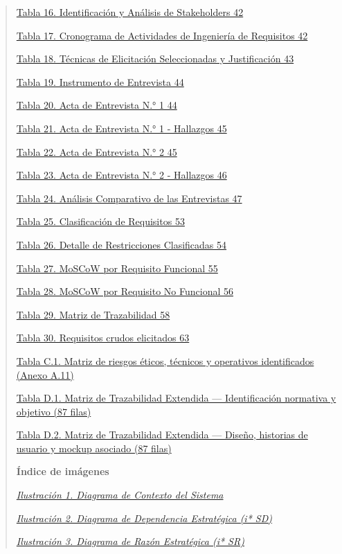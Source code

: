 \documentclass[
]{article}
\begin{document}
\begin{quote}
\hyperref[_bookmark70]{Tabla 16. Identificación y Análisis de Stakeholders 42}

\hyperref[_bookmark72]{Tabla 17. Cronograma de Actividades de Ingeniería de Requisitos 42}

\hyperref[_bookmark74]{Tabla 18. Técnicas de Elicitación Seleccionadas y Justificación 43}

\hyperref[_bookmark77]{Tabla 19. Instrumento de Entrevista 44}

\hyperref[_bookmark79]{Tabla 20. Acta de Entrevista N.° 1 44}

\hyperref[_bookmark80]{Tabla 21. Acta de Entrevista N.° 1 - Hallazgos 45}

\hyperref[_bookmark81]{Tabla 22. Acta de Entrevista N.° 2 45}

\hyperref[_bookmark82]{Tabla 23. Acta de Entrevista N.° 2 - Hallazgos 46}

\hyperref[_bookmark84]{Tabla 24. Análisis Comparativo de las Entrevistas 47}

\hyperref[_bookmark102]{Tabla 25. Clasificación de Requisitos 53}

\hyperref[_bookmark103]{Tabla 26. Detalle de Restricciones Clasificadas 54}

\hyperref[_bookmark104]{Tabla 27. MoSCoW por Requisito Funcional 55}

\hyperref[_bookmark106]{Tabla 28. MoSCoW por Requisito No Funcional 56}

\hyperref[_bookmark113]{Tabla 29. Matriz de Trazabilidad 58}

\hyperref[_bookmark117]{Tabla 30. Requisitos crudos elicitados 63}

\hyperref[_bookmarkC7]{Tabla C.1. Matriz de riesgos éticos, técnicos y operativos identificados (Anexo A.11)}

\hyperref[_bookmarkD1]{Tabla D.1. Matriz de Trazabilidad Extendida --- Identificación normativa y objetivo (87 filas)}

\hyperref[_bookmarkD2]{Tabla D.2. Matriz de Trazabilidad Extendida --- Diseño, historias de usuario y mockup asociado (87 filas)}

\textbf{Índice de imágenes}

\hyperref[_bookmark13]{\emph{Ilustración 1. Diagrama de Contexto del Sistema}}

\hyperref[_bookmark19b]{\emph{Ilustración 2. Diagrama de Dependencia Estratégica (i* SD)}}

\hyperref[_bookmark19c]{\emph{Ilustración 3. Diagrama de Razón Estratégica (i* SR)}}


\end{quote}
\end{document}

